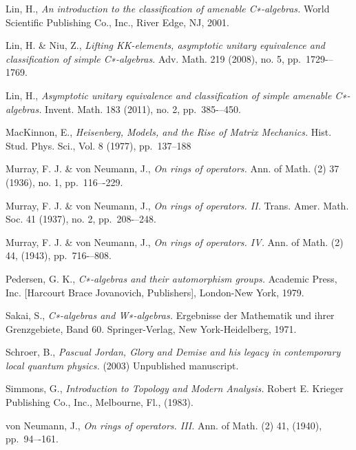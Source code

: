 \documentclass[12pt,a4paper]{amsart}
\theoremstyle{plain}
\theoremstyle{definition}
\begin{document}
\begin{thebibliography}{00}
	Lin, H.,
	\emph{An introduction to the classification of amenable C∗-algebras.}
	World Scientific Publishing Co., Inc., River Edge, NJ, 2001.
	
	Lin, H. \& Niu, Z.,
	\emph{Lifting KK-elements, asymptotic unitary equivalence and classification of simple C∗-algebras.}
	Adv. Math. 219 (2008), no. 5, pp.~1729-–1769. 
	
	Lin, H.,
	\emph{Asymptotic unitary equivalence and classification of simple amenable C∗-algebras.}
	Invent. Math. 183 (2011), no. 2, pp.~385-–450. 

	MacKinnon, E.,
	\emph{Heisenberg, Models, and the Rise of Matrix Mechanics.}
	Hist. Stud. Phys. Sci., Vol. 8 (1977), pp.~137--188
	
	Murray, F. J. \& von Neumann, J.,
	\emph{On rings of operators.}
	Ann. of Math. (2) 37 (1936), no. 1, pp.~116–-229.

	Murray, F. J. \& von Neumann, J.,
	\emph{On rings of operators. II.}
	Trans. Amer. Math. Soc. 41 (1937), no. 2, pp.~208-–248. 

	Murray, F. J. \& von Neumann, J.,
	\emph{On rings of operators. IV.}
	Ann. of Math. (2) 44, (1943), pp.~716-–808.
	
	Pedersen, G. K.,
	\emph{C∗-algebras and their automorphism groups.}
	Academic Press, Inc. [Harcourt Brace Jovanovich, Publishers], London-New York, 1979.

	Sakai, S.,
	\emph{C∗-algebras and W∗-algebras.}
	Ergebnisse der Mathematik und ihrer Grenzgebiete, Band 60. Springer-Verlag, New York-Heidelberg, 1971.

	Schroer, B.,
	\emph{Pascual Jordan, Glory and Demise and his legacy in contemporary local quantum physics.}
	(2003) Unpublished manuscript.
	
	Simmons, G.,
	\emph{Introduction to Topology and Modern Analysis.}
	Robert E. Krieger Publishing Co., Inc., Melbourne, Fl., (1983).

	von Neumann, J.,
	\emph{On rings of operators. III.}
	Ann. of Math. (2) 41, (1940), pp.~94–-161.

	
\end{thebibliography}
\end{document}
